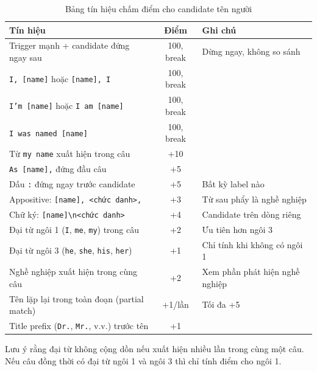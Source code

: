 \begin{table}[H]
    \centering
    \caption{Bảng tín hiệu chấm điểm cho candidate tên người}
    \label{tab:scoring}
    \renewcommand{\arraystretch}{1.3}
    \begin{tabular}{p{8cm} c p{4.5cm}}
        \toprule
        \textbf{Tín hiệu} & \textbf{Điểm} & \textbf{Ghi chú} \\
        \midrule
        Trigger mạnh + candidate đứng ngay sau &
            100, break & Dừng ngay, không so sánh \\
        \texttt{I, [name]} hoặc \texttt{[name], I} &
            100, break & \\
        \texttt{I'm [name]} hoặc \texttt{I am [name]} &
            100, break & \\
        \texttt{I was named [name]} &
            100, break & \\
        Từ \texttt{my name} xuất hiện trong câu &
            +10 & \\
        \texttt{As [name],} đứng đầu câu &
            +5  & \\
        Dấu \texttt{:} đứng ngay trước candidate &
            +5  & Bất kỳ label nào \\
        Appositive: \texttt{[name], <chức danh>,} &
            +3  & Từ sau phẩy là nghề nghiệp \\
        Chữ ký: \texttt{[name]{\textbackslash}n<chức danh>} &
            +4  & Candidate trên dòng riêng \\
        Đại từ ngôi 1 (\texttt{I}, \texttt{me}, \texttt{my}) trong câu &
            +2  & Ưu tiên hơn ngôi 3 \\
        Đại từ ngôi 3 (\texttt{he}, \texttt{she}, \texttt{his}, \texttt{her}) &
            +1  & Chỉ tính khi không có ngôi 1 \\
        Nghề nghiệp xuất hiện trong cùng câu &
            +2  & Xem phần phát hiện nghề nghiệp \\
        Tên lặp lại trong toàn đoạn (partial match) &
            +1/lần & Tối đa +5 \\
        Title prefix (\texttt{Dr.}, \texttt{Mr.}, v.v.) trước tên &
            +1  & \\
        \bottomrule
    \end{tabular}
\end{table}

Lưu ý rằng đại từ không cộng dồn nếu xuất hiện nhiều lần trong cùng một câu.
Nếu câu đồng thời có đại từ ngôi 1 và ngôi 3 thì chỉ tính điểm cho ngôi 1.

